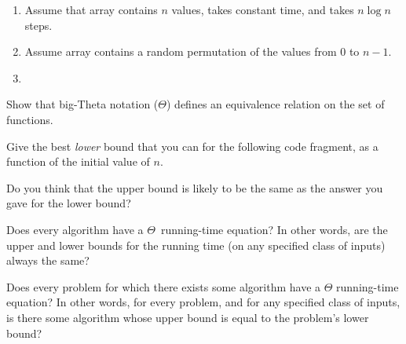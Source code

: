 \begin{exercises}
\begin{enumerate}
\item
\vspace{-\bigskipamount}
Assume that array  contains \(n\) values,  takes
constant time, and  takes \(n \log n\) steps.

\vspace{-\medskipamount}

\item
\vspace{-\medskipamount}
Assume array  contains a random permutation of the values from
0 to \(n-1\).

\vspace{-\bigskipamount}

\vspace{-\bigskipamount}\vspace{-\medskipamount}
\item {}

\vspace{-\bigskipamount}
\end{enumerate}

\item
Show that big-Theta notation (\(\Theta\)) defines an equivalence
relation on the set of functions.

\item
\label{Collatz}
Give the best \emph{lower} bound that you can for the following code
fragment, as a function of the initial value of \(n\).


\noindent Do you think that the upper bound is likely to be the same
as the answer you gave for the lower bound?

\item
Does every algorithm have a \(\Theta\)~running-time
equation?
In other words, are the upper and lower bounds for the running time
(on any specified class of inputs) always the same?

\item
Does every problem for which there exists some algorithm have a
\(\Theta\) running-time
equation?
In other words, for every problem, and for any specified class of
inputs, is there some algorithm whose upper bound is equal to the
problem's lower bound?



\end{exercises}
